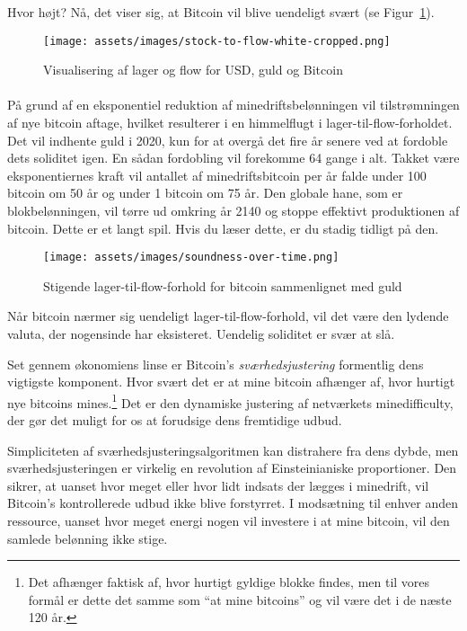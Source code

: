 Hvor højt? Nå, det viser sig, at Bitcoin vil blive uendeligt svært (se
Figur~\ref{fig:stock-to-flow-white-cropped}).

\begin{figure}[htbp]
  \centering
  \texttt{[image: assets/images/stock-to-flow-white-cropped.png]}
  \caption{Visualisering af lager og flow for USD, guld og Bitcoin}
  \label{fig:stock-to-flow-white-cropped}
\end{figure}

\paragraph{}
På grund af en eksponentiel reduktion af minedriftsbelønningen vil 
tilstrømningen af nye bitcoin aftage, hvilket resulterer i en himmelflugt i 
lager-til-flow-forholdet. Det vil indhente guld i 2020, kun for at overgå det 
fire år senere ved at fordoble dets soliditet igen. En sådan fordobling vil 
forekomme 64 gange i alt. Takket være eksponentiernes kraft vil antallet af 
minedriftsbitcoin per år falde under 100 bitcoin om 50 år og under 1 bitcoin om
75 år. Den globale hane, som er blokbelønningen, vil tørre ud omkring år 2140
og stoppe effektivt produktionen af bitcoin. Dette er et langt spil. Hvis du 
læser dette, er du stadig tidligt på den.

\begin{figure}[htbp]
  \centering
  \texttt{[image: assets/images/soundness-over-time.png]}
  \caption{Stigende lager-til-flow-forhold for bitcoin sammenlignet med guld}
  \label{fig:soundness-over-time}
\end{figure}

Når bitcoin nærmer sig uendeligt lager-til-flow-forhold, vil det være den
lydende valuta, der nogensinde har eksisteret. Uendelig soliditet er svær at 
slå.

Set gennem økonomiens linse er Bitcoin's \textit{sværhedsjustering}
formentlig dens vigtigste komponent. Hvor svært det er at mine bitcoin afhænger
af, hvor hurtigt nye bitcoins mines.\footnote{Det afhænger faktisk af, hvor
hurtigt gyldige blokke findes, men til vores formål er dette det samme som
\enquote{at mine bitcoins} og vil være det i de næste 120 år.} Det er den 
dynamiske justering af netværkets minedifficulty, der gør det muligt for os at 
forudsige dens fremtidige udbud.

Simpliciteten af sværhedsjusteringsalgoritmen kan distrahere fra dens dybde,
men sværhedsjusteringen er virkelig en revolution af Einsteinianiske 
proportioner. Den sikrer, at uanset hvor meget eller hvor lidt indsats der 
lægges i minedrift, vil Bitcoin's kontrollerede udbud ikke blive forstyrret. 
I modsætning til enhver anden ressource, uanset hvor meget energi nogen vil 
investere i at mine bitcoin, vil den samlede belønning ikke stige.

